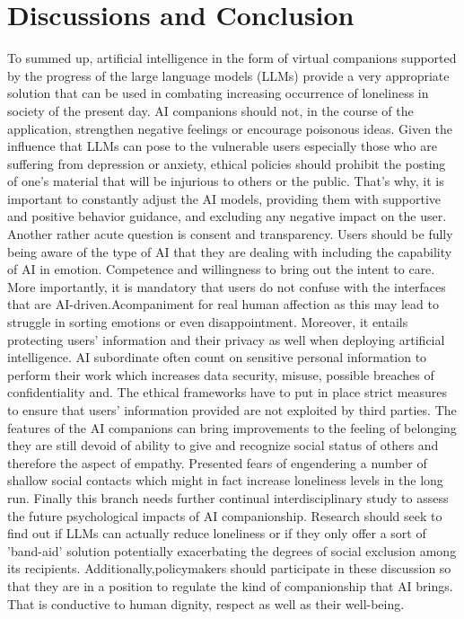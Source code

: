 \section{Discussions and Conclusion}
To summed up, artificial intelligence in the form of virtual companions supported by the progress of the large language models (LLMs) provide a very appropriate solution that can be used in combating increasing occurrence of loneliness in society of the present day. AI companions should not, in the course of the application, strengthen negative feelings or encourage poisonous ideas. Given the influence that LLMs can pose to the vulnerable users especially those who are suffering from depression or anxiety, ethical policies should prohibit the posting of one's material that will be injurious to others or the public. That's why, it is important to constantly adjust the AI models, providing them with supportive and positive behavior guidance, and excluding any negative impact on the user. 
Another rather acute question is consent and transparency. Users should be fully being aware of the type of AI that they are dealing with including the capability of AI in emotion. Competence and willingness to bring out the intent to care. More importantly, it is mandatory that users do not confuse with the interfaces that are AI-driven.Acompaniment for real human affection as this may lead to struggle in sorting emotions or even disappointment. Moreover, it entails protecting users' information and their privacy as well when deploying artificial intelligence. AI subordinate often count on sensitive personal information to perform their work which increases data security, misuse, possible breaches of confidentiality and. The ethical frameworks have to put in place strict measures to ensure that users' information provided are not exploited by third parties. The features of the AI companions can bring improvements to the  feeling of belonging they are still devoid of ability to give and recognize social status of others and therefore the aspect of empathy.  Presented fears of engendering a number of shallow social contacts which might in fact increase loneliness levels in the long run. Finally this branch needs further continual interdisciplinary study to assess the future psychological  impacts of AI companionship. Research should seek to find out if LLMs can actually reduce loneliness or if they only offer a sort of 'band-aid' solution potentially exacerbating the degrees of social exclusion among its recipients. Additionally,policymakers should participate in these discussion so that they are in a position to regulate the kind of companionship that AI brings. That is conductive to human dignity, respect as well as their well-being.